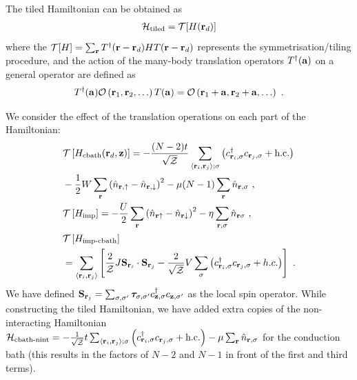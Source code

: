 \documentclass[%
 reprint,
superscriptaddress,
groupedaddress,
 amsmath,amssymb,
 aps,
prl,superscriptaddress
]{revtex4-2}
\begin{document}
The tiled Hamiltonian can be obtained as 
\begin{equation}\begin{aligned}
	\mathcal{H}_\text{tiled} = \mathcal{T}[H({\bf r}_d)]
\end{aligned}\end{equation}
where the $\mathcal{T}[H] = \sum_{{\bf r}}T^\dagger({\bf r} - {\bf r}_d)HT({\bf r} - {\bf r}_d)$ represents the symmetrisation/tiling procedure, and the action of the many-body translation operators $T^\dagger({\bf a})$ on a general operator are defined as
\begin{equation}\begin{aligned}
T^\dagger({\bf a}) \mathcal{O}\left({\bf r}_1, {\bf r}_2,\ldots\right)T({\bf a}) = \mathcal{O}\left({\bf r}_1 + {\bf a}, {\bf r}_2 + {\bf a},\ldots\right)~.
\end{aligned}\end{equation}

We consider the effect of the translation operations on each part of the Hamiltonian:
\begin{equation}\begin{aligned}
	&\mathcal{T}\left[{H}_\text{cbath}({\bf r}_d, {\bf z})\right] = -\frac{(N-2)t}{\sqrt\mathcal{Z}}\sum_{\left<{\bf r}_i, {\bf r}_j\right>;\sigma}\left(c^\dagger_{{\bf r}_i,\sigma}c_{{\bf r}_j,\sigma} + \text{h.c.}\right) \\
    &- \frac{1}{2}W\sum_{\bf r}\left(\hat n_{{\bf r} , \uparrow} - \hat n_{{\bf r} , \downarrow}\right)^2 - \mu (N-1) \sum_{{\bf r}}\hat n_{{\bf r},\sigma}~,\\
	&\mathcal{T}\left[{H}_\text{imp}\right] = -\frac{U}{2}\sum_{{\bf r}}\left(\hat n_{{\bf r} \uparrow} - \hat n_{{\bf r} \downarrow} \right)^2 - \eta\sum_{{\bf r},\sigma} \hat n_{{\bf r}\sigma}~,\\
    &\mathcal{T}\left[{H}_\text{imp-cbath}\right]\\
     &=\sum_{\left< {\bf r}_i, {\bf r}_j\right>}\left[\frac{2}{\mathcal{Z}}J {\bf S}_{{\bf r}_i}\cdot{\bf S}_{{\bf r}_j} - \frac{2}{\sqrt\mathcal{Z}}V \sum_{\sigma}\left(c^\dagger_{{\bf r}_i,\sigma} c_{{{\bf r}_j},\sigma} + h.c.\right)\right]~.
\end{aligned}\end{equation}
We have defined \({\bf S}_{{\bf r}_j} =\sum_{\sigma,\sigma^\prime} {\boldsymbol \tau}_{\sigma,\sigma^\prime}c^\dagger_{{\bf z},\sigma}c_{{\bf z},\sigma^\prime}\) as the local spin operator. While constructing the tiled Hamiltonian, we have added extra copies of the non-interacting Hamiltonian \(\mathcal{H}_\text{cbath-nint} = -\frac{1}{\sqrt\mathcal{Z}}t\sum_{\left<{\bf r}_i, {\bf r}_j\right>;\sigma}\left(c^\dagger_{{\bf r}_i,\sigma}c_{{\bf r}_j,\sigma} + \text{h.c.}\right) - \mu \sum_{{\bf r}}\hat n_{{\bf r},\sigma}\) for the conduction bath (this results in the factors of \(N-2\) and \(N-1\) in front of the first and third terms).
\end{document}
